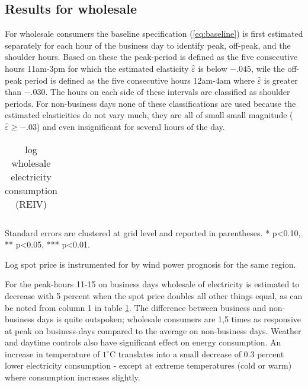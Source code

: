 \label{sec:results}
\subsection{Results for wholesale}
\label{subsec:r_wholesale}
For wholesale consumers the baseline specification (\ref{eq:baseline}) is first estimated separately for each hour of the business day to identify peak, off-peak, and the shoulder hours. Based on these the peak-period is defined as the five consecutive hours 11am-3pm for which the estimated elasticity $\hat{\varepsilon}$ is below $-.045$, wile the off-peak period is defined as the five consecutive hours 12am-4am where $\hat{\varepsilon}$ is greater than $-.030$. The hours on each side of these intervals are classified as shoulder periods. For non-business days none of these classifications are used because the estimated elasticities do not vary much, they are all of small small magnitude ($\hat{\varepsilon}\geq-.03$)  and even insignificant for several hours of the day.

\begin{table}[H]
\begin{threeparttable}
  \centering
  \caption{log wholesale electricity consumption (REIV)}
  \footnotesize
    \begin{tabular}{lcccc}
        
    \end{tabular}
    \begin{tablenotes}
    \item Standard errors are clustered at grid level and reported in parentheses. * p<0.10, ** p<0.05, *** p<0.01.
    \item Log spot price is instrumented for by wind power prognosis for the same region.
     \end{tablenotes}
  \label{tab:ws_preferred}
\end{threeparttable}
\end{table}
\noindent
For the peak-hours 11-15 on business days wholesale of electricity is estimated to decrease with 5 percent when the spot price doubles all other things equal, as can be noted from column 1 in table \ref{tab:ws_preferred}. The difference between business and non-business days is quite outspoken; wholesale consumers are 1,5 times as responsive at peak on business-days compared to the average on non-business days. Weather and daytime controls also have significant effect on energy consumption. An increase in temperature of  $1^{\circ}$C translates into a small decrease of 0.3 percent lower electricity consumption - except at extreme temperatures (cold or warm) where consumption increases slightly.   

